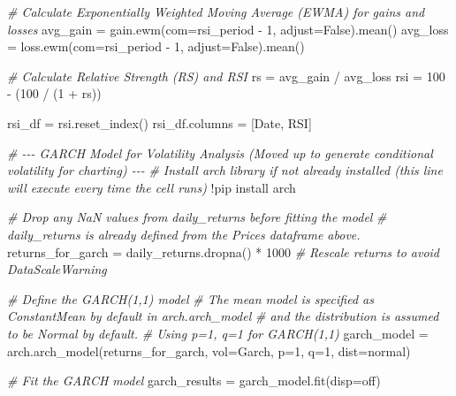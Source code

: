 \documentclass[
  11pt,
]{article}
\newenvironment{Shaded}{}{}
\newcommand{\CommentTok}[1]{\textcolor[rgb]{0.38,0.63,0.69}{\textit{#1}}}
\newcommand{\DecValTok}[1]{\textcolor[rgb]{0.25,0.63,0.44}{#1}}
\newcommand{\NormalTok}[1]{#1}
\newcommand{\OperatorTok}[1]{\textcolor[rgb]{0.40,0.40,0.40}{#1}}
\newcommand{\StringTok}[1]{\textcolor[rgb]{0.25,0.44,0.63}{#1}}
\newcommand{\VariableTok}[1]{\textcolor[rgb]{0.10,0.09,0.49}{#1}}
\begin{document}
\begin{Shaded}
\begin{Highlighting}[]
\CommentTok{\# Calculate Exponentially Weighted Moving Average (EWMA) for gains and losses}
\NormalTok{avg\_gain }\OperatorTok{=}\NormalTok{ gain.ewm(com}\OperatorTok{=}\NormalTok{rsi\_period }\OperatorTok{{-}} \DecValTok{1}\NormalTok{, adjust}\OperatorTok{=}\VariableTok{False}\NormalTok{).mean()}
\NormalTok{avg\_loss }\OperatorTok{=}\NormalTok{ loss.ewm(com}\OperatorTok{=}\NormalTok{rsi\_period }\OperatorTok{{-}} \DecValTok{1}\NormalTok{, adjust}\OperatorTok{=}\VariableTok{False}\NormalTok{).mean()}

\CommentTok{\# Calculate Relative Strength (RS) and RSI}
\NormalTok{rs }\OperatorTok{=}\NormalTok{ avg\_gain }\OperatorTok{/}\NormalTok{ avg\_loss}
\NormalTok{rsi }\OperatorTok{=} \DecValTok{100} \OperatorTok{{-}}\NormalTok{ (}\DecValTok{100} \OperatorTok{/}\NormalTok{ (}\DecValTok{1} \OperatorTok{+}\NormalTok{ rs))}

\NormalTok{rsi\_df }\OperatorTok{=}\NormalTok{ rsi.reset\_index()}
\NormalTok{rsi\_df.columns }\OperatorTok{=}\NormalTok{ [}\StringTok{\textquotesingle{}Date\textquotesingle{}}\NormalTok{, }\StringTok{\textquotesingle{}RSI\textquotesingle{}}\NormalTok{]}


\CommentTok{\# {-}{-}{-} GARCH Model for Volatility Analysis (Moved up to generate conditional volatility for charting) {-}{-}{-}}
\CommentTok{\# Install arch library if not already installed (this line will execute every time the cell runs)}
\OperatorTok{!}\NormalTok{pip install arch}

\CommentTok{\# Drop any NaN values from daily\_returns before fitting the model}
\CommentTok{\# daily\_returns is already defined from the Prices dataframe above.}
\NormalTok{returns\_for\_garch }\OperatorTok{=}\NormalTok{ daily\_returns.dropna() }\OperatorTok{*} \DecValTok{1000} \CommentTok{\# Rescale returns to avoid DataScaleWarning}

\CommentTok{\# Define the GARCH(1,1) model}
\CommentTok{\# The mean model is specified as ConstantMean by default in arch.arch\_model}
\CommentTok{\# and the distribution is assumed to be Normal by default.}
\CommentTok{\# Using p=1, q=1 for GARCH(1,1)}
\NormalTok{garch\_model }\OperatorTok{=}\NormalTok{ arch.arch\_model(returns\_for\_garch, vol}\OperatorTok{=}\StringTok{\textquotesingle{}Garch\textquotesingle{}}\NormalTok{, p}\OperatorTok{=}\DecValTok{1}\NormalTok{, q}\OperatorTok{=}\DecValTok{1}\NormalTok{, dist}\OperatorTok{=}\StringTok{\textquotesingle{}normal\textquotesingle{}}\NormalTok{)}

\CommentTok{\# Fit the GARCH model}
\NormalTok{garch\_results }\OperatorTok{=}\NormalTok{ garch\_model.fit(disp}\OperatorTok{=}\StringTok{\textquotesingle{}off\textquotesingle{}}\NormalTok{)}


\end{Highlighting}
\end{Shaded}
\end{document}

